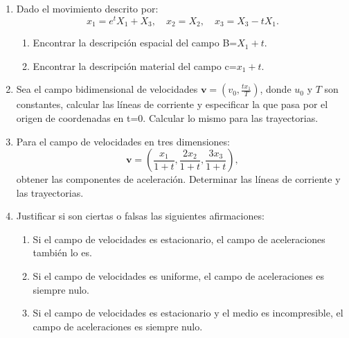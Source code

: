 \documentclass[12pt,a4paper]{article}
\title{\mathbf{Mecánica de Medios Continuos \\Práctica 1 \\ Descripción del movimiento}}
\author{Universidad de Cuenca}
\begin{document}
\maketitle
\begin{enumerate}
    \item Dado el movimiento descrito por:
        \begin{equation}
            x_1=e^{t}X_1+X_3,\quad x_2=X_2,\quad x_3=X_3-tX_1.
        \end{equation}
        \begin{enumerate}
            \item Encontrar la descripción espacial del campo B=$X_1+t$.
            \item Encontrar la descripción material del campo c=$x_1+t$.
        \end{enumerate}
    \item Sea el campo bidimensional de velocidades $\mathbf{v}=(v_0,\frac{tx_1}{T})$, donde $u_0$ y $T$ son constantes, calcular las líneas de corriente y especificar la que pasa por el origen de coordenadas en t=0. Calcular lo mismo para las trayectorias.
    \item Para el campo de velocidades en tres dimensiones:
    \begin{equation}
        \mathbf{v}=\left(\frac{x_1}{1+t},\frac{2x_2}{1+t},\frac{3x_3}{1+t}\right),
    \end{equation}
    obtener las componentes de aceleración. Determinar las líneas de corriente y las trayectorias.
    \item Justificar si son ciertas o falsas las siguientes afirmaciones:
    \begin{enumerate}
        \item Si el campo de velocidades es estacionario, el campo de aceleraciones también lo es.
        \item Si el campo de velocidades es uniforme, el campo de aceleraciones es siempre nulo.
        \item Si el campo de velocidades es estacionario y el medio es incompresible, el campo de aceleraciones es siempre nulo.
    \end{enumerate}
\end{enumerate}
\end{document}
